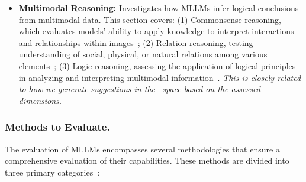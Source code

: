 \begin{itemize}[leftmargin=*]
    \item \textbf{Multimodal Reasoning:} Investigates how MLLMs infer logical conclusions from multimodal data. This section covers:
    (1) Commonsense reasoning, which evaluates models' ability to apply knowledge to interpret interactions and relationships within images~\cite{lin2024draw,yuan2024ospreypixelunderstandingvisual};
    (2) Relation reasoning, testing understanding of social, physical, or natural relations among various elements~\cite{liu2024ii,reid2024gemini};
    (3) Logic reasoning, assessing the application of logical principles in analyzing and interpreting multimodal information~\cite{liu2023mmbench,bai2023touchstone}. \textit{This is closely related to how we generate suggestions in the \dataset~space based on the assessed dimensions.}
\end{itemize}
\subsubsection{Methods to Evaluate.}
The evaluation of MLLMs encompasses several methodologies that ensure a comprehensive evaluation of their capabilities. These methods are divided into three primary categories~\cite{huang2024survey}:
